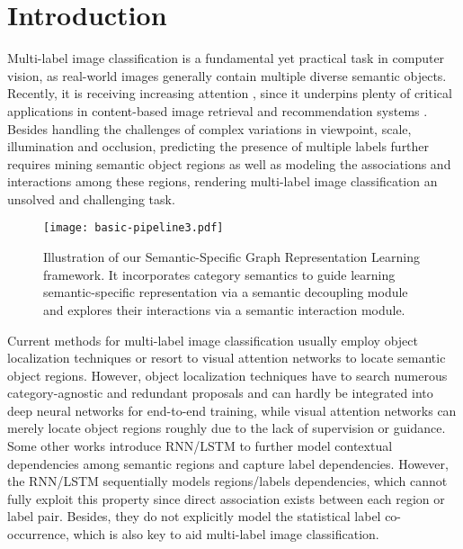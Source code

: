 \documentclass[10pt,twocolumn,letterpaper]{article}
\begin{document}
\section{Introduction}
Multi-label image classification is a fundamental yet practical task in computer vision, as real-world images generally contain multiple diverse semantic objects. Recently, it is receiving increasing attention \cite{li2017improving,wei2016hcp,zhu2017learning}, since it underpins plenty of critical applications in content-based image retrieval and recommendation systems \cite{chua1994concept,yang2015pinterest}. Besides handling the challenges of complex variations in viewpoint, scale, illumination and occlusion, predicting the presence of multiple labels further requires mining semantic object regions as well as modeling the associations and interactions among these regions, rendering multi-label image classification an unsolved and challenging task.

\begin{figure}[!t]
   \centering
   \texttt{[image: basic-pipeline3.pdf]} \caption{Illustration of our Semantic-Specific Graph Representation Learning framework. It incorporates category semantics to guide learning semantic-specific representation via a semantic decoupling module and explores their interactions via a semantic interaction module.}
   \label{fig:mini-pipeline}
\end{figure}

Current methods for multi-label image classification usually employ object localization techniques \cite{wei2016hcp,yang2016exploit} or resort to visual attention networks \cite{zhu2017learning} to locate semantic object regions. However, object localization techniques \cite{uijlings2013selective,zitnick2014edge} have to search numerous category-agnostic and redundant proposals and can hardly be integrated into deep neural networks for end-to-end training, while visual attention networks can merely locate object regions roughly due to the lack of supervision or guidance. Some other works introduce RNN/LSTM \cite{hochreiter1997long,wang2016cnn,chen2018recurrent} to further model contextual dependencies among semantic regions and capture label dependencies. However, the RNN/LSTM sequentially models regions/labels dependencies, which cannot fully exploit this property since direct association exists between each region or label pair. Besides, they do not explicitly model the statistical label co-occurrence, which is also key to aid multi-label image classification.
\end{document}
